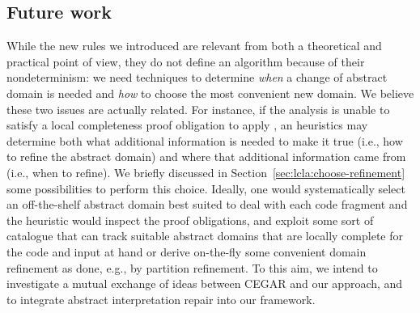 \subsection{Future work}
While the new rules we introduced are relevant from both a theoretical and practical point of view, they do not define an algorithm because of their nondeterminism:
we need techniques to determine \emph{when} a change of abstract domain is needed and \emph{how} to choose the most convenient new domain.
We believe these two issues are actually related. For instance, if the analysis is unable to satisfy a local completeness proof obligation to apply , an heuristics may determine both what additional information is needed to make it true (i.e., how to refine the abstract domain) and where that additional information came from (i.e., when to refine). We briefly discussed in Section~\ref{sec:lcla:choose-refinement} some possibilities to perform this choice.
Ideally, one would systematically select an off-the-shelf abstract domain best suited to deal with each code fragment and the heuristic would inspect the proof obligations, and exploit some sort of catalogue that can track suitable abstract domains that are locally complete for the code and input at hand or derive on-the-fly some convenient domain refinement as done, e.g., by partition refinement.
To this aim, we intend to investigate a mutual exchange of ideas between CEGAR and our approach, and to integrate abstract interpretation repair into our framework.

